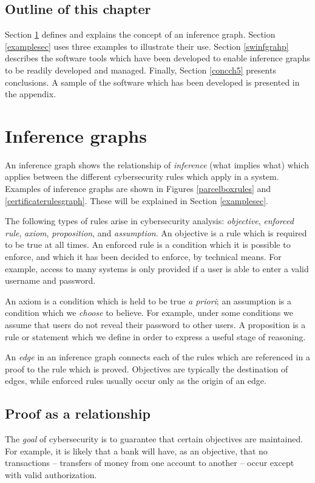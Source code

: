 \subsection{Outline of this chapter}
Section \ref{inferencesec} defines and explains the concept of an inference graph.
Section \ref{examplesec} uses three examples to illustrate their use. Section \ref{swinfgrahp}
describes the software tools which have been developed to enable inference
graphs to be readily developed and managed. Finally, Section \ref{concch5}
presents conclusions. A sample of the software which has been developed is presented in the appendix.

 
\section{Inference graphs}\label{inferencesec}
An inference graph shows the relationship of {\em inference} (what implies what)
which applies between the different cybersecurity rules which apply in a system.
Examples of inference graphs are shown in Figures \ref{parcelboxrules} 
and \ref{certificaterulesgraph}. These will be explained in Section \ref{examplesec}.

The following types of rules arise in cybersecurity analysis:
{\em objective}, {\em enforced rule}, {\em axiom}, {\em proposition}, and {\em assumption}.
An objective is a rule which is required to be true at all times.
An enforced rule is a condition which it is possible to enforce,
and which it has been decided to enforce, by technical means.
For example, access to many systems is only provided if a user is able
to enter a valid username and password.

An axiom is a condition which is held to be true {\em a priori};
an assumption is a condition which we {\em choose} to believe.
For example, under some conditions we assume that users do not reveal their
password to other users.
A proposition is a rule or statement which we define in order
to express a useful stage of reasoning.

An {\em edge} in an inference graph connects each of the rules which
 are referenced in a proof to the rule which is proved. Objectives
are typically the destination of edges, while enforced rules 
usually occur only as the origin of an edge.


\subsection{Proof as a relationship}
The {\em goal} of cybersecurity is to guarantee that certain objectives
are maintained. For example, it is likely that a bank will have, as an
objective, that no transactions -- transfers of money from
one account to another -- occur except with valid authorization.

